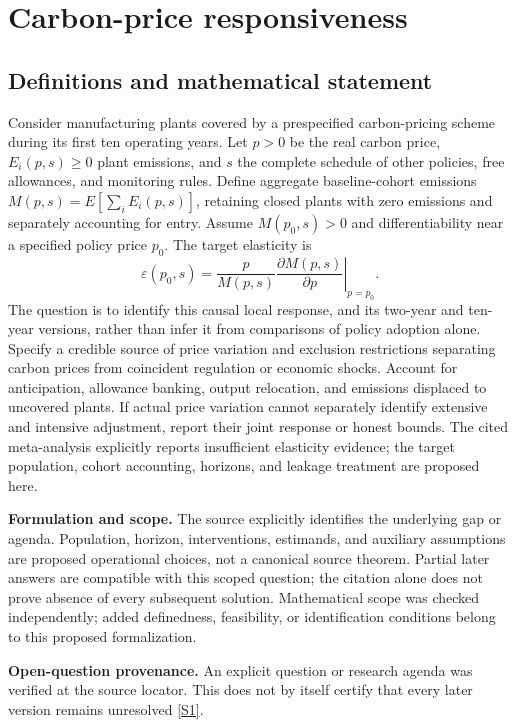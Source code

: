 \documentclass[11pt]{article}
\newcommand{\sref}[2]{\hyperlink{source:#1:#2}{[S#2]}}
\begin{document}
\section*{Carbon-price responsiveness}\label{30007717}
\subsection{Definitions and mathematical statement}
Consider manufacturing plants covered by a prespecified carbon-pricing scheme during its first ten operating years. Let \(p>0\) be the real carbon price, \(E_i(p,s)\geq0\) plant emissions, and \(s\) the complete schedule of other policies, free allowances, and monitoring rules. Define aggregate baseline-cohort emissions \(M(p,s)=E[\sum_i E_i(p,s)]\), retaining closed plants with zero emissions and separately accounting for entry. Assume \(M(p_0,s)>0\) and differentiability near a specified policy price \(p_0\). The target elasticity is
\[\varepsilon(p_0,s)=\left.\frac{p}{M(p,s)}\frac{\partial M(p,s)}{\partial p}\right|_{p=p_0}.\]
The question is to identify this causal local response, and its two-year and ten-year versions, rather than infer it from comparisons of policy adoption alone. Specify a credible source of price variation and exclusion restrictions separating carbon prices from coincident regulation or economic shocks. Account for anticipation, allowance banking, output relocation, and emissions displaced to uncovered plants. If actual price variation cannot separately identify extensive and intensive adjustment, report their joint response or honest bounds. The cited meta-analysis explicitly reports insufficient elasticity evidence; the target population, cohort accounting, horizons, and leakage treatment are proposed here.

\par\textbf{Formulation and scope.} The source explicitly identifies the underlying gap or agenda. Population, horizon, interventions, estimands, and auxiliary assumptions are proposed operational choices, not a canonical source theorem. Partial later answers are compatible with this scoped question; the citation alone does not prove absence of every subsequent solution. Mathematical scope was checked independently; added definedness, feasibility, or identification conditions belong to this proposed formalization.

\par\textbf{Open-question provenance.} An explicit question or research agenda was verified at the source locator. This does not by itself certify that every later version remains unresolved \sref{30007717}{1}.
\end{document}
